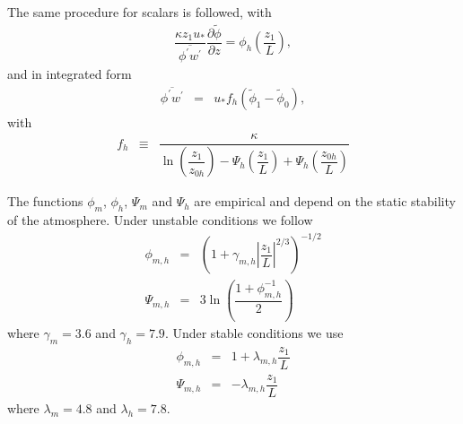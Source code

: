 \documentclass[gmd]{copernicus}
\newcommand{\phif}{\ensuremath{\widetilde{\phi}}}
\begin{document}
The same procedure for scalars is followed, with
\begin{eqnarray}
\dfrac{\kappa z_1 u_*}{\overline{\phi^\prime w^\prime}} \dfrac{\partial \phif}{\partial z} =
\phi_h \left( \dfrac{z_1}{L} \right),
\end{eqnarray}
and in integrated form
\begin{eqnarray}
\overline{\phi^\prime w^\prime} & = & u_* f_h \left( \phif_1 - \phif_0 \right),
\end{eqnarray}
with
\begin{eqnarray}
f_h & \equiv &
\dfrac{\kappa}
{ \ln{\left( \dfrac{z_1}{z_{0h}} \right)}
	- \varPsi_h \left( \dfrac{z_1}{L} \right)
	+ \varPsi_h \left( \dfrac{z_{0h}}{L} \right) }
\end{eqnarray}

The functions $\phi_m$, $\phi_h$, $\varPsi_m$ and $\varPsi_h$ are empirical and depend on the static stability of the atmosphere. Under unstable conditions we follow \citet{Wilson2001, Wyngaard2010} 
\begin{eqnarray}
\phi_{m,h} & = & \left( 1 + \gamma_{m,h} \left| \dfrac{z_1}{L} \right|^{2/3} \right)^{-1/2}\\
\varPsi_{m,h} & = & 3 \ln{\left( \dfrac{1 + \phi_{m,h}^{-1}}{2} \right)} 
\end{eqnarray}
where $\gamma_m = 3.6$ and $\gamma_h = 7.9$. Under stable conditions we use \citet{Hogstrom1988, Wyngaard2010}
\begin{eqnarray}
\phi_{m,h} & = & 1 + \lambda_{m,h} \dfrac{z_1}{L}\\
\varPsi_{m,h} & = & - \lambda_{m,h} \dfrac{z_1}{L}
\end{eqnarray}
where $\lambda_m = 4.8$ and $\lambda_h = 7.8$.
\end{document}
